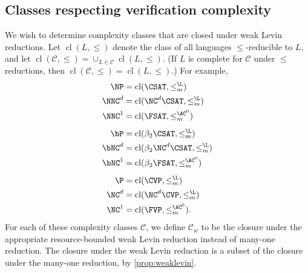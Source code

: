 \documentclass{article}
\DeclareMathOperator{\cl}{cl}
\begin{document}
\subsection{Classes respecting verification complexity}

We wish to determine complexity classes that are closed under weak Levin reductions.
Let $\cl(L, \leq)$ denote the class of all languages $\leq$-reducible to $L$, and let $\cl(\mathcal{C}, \leq) = \cup_{L \in \mathcal{C}} \cl(L, \leq)$.
(If $L$ is complete for $\mathcal{C}$ under $\leq$ reductions, then $\cl(\mathcal{C}, \leq) = \cl(L, \leq)$.)
For example,
\begin{align*}
  \NP & = \cl(\CSAT, \leq^\L_m) \\
  \NNC^d & = \cl(\NC^d \CSAT, \leq^\L_m) \\
  \NNC^1 & = \cl(\FSAT, \leq^{\AC^0}_m) \\[1ex]
  \bP & = \cl(\beta_2 \CSAT, \leq^\L_m) \\
  \bNC^d & = \cl(\beta_2 \NC^d \CSAT, \leq^\L_m) \\
  \bNC^1 & = \cl(\beta_2 \FSAT, \leq^{\AC^0}_m) \\[1ex]
  \P & = \cl(\CVP, \leq^\L_m) \\
  \NC^d & = \cl(\NC^d \CVP, \leq^\L_m) \\
  \NC^1 & = \cl(\FVP, \leq^{\AC^0}_m).
\end{align*}
For each of these complexity classes $\mathcal{C}$, we define $\mathcal{C}_w$ to be the closure under the appropriate resource-bounded weak Levin reduction instead of many-one reduction.
The closure under the weak Levin reduction is a subset of the closure under the many-one reduction, by \autoref{prop:weaklevin}.

\end{document}
